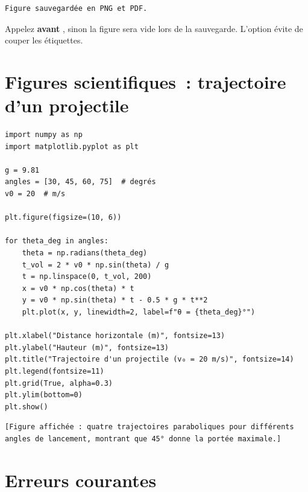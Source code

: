 \begin{codeoutput}
\begin{verbatim}
Figure sauvegardée en PNG et PDF.
\end{verbatim}
\end{codeoutput}

\begin{attention}
Appelez  \textbf{avant} , sinon la figure sera
vide lors de la sauvegarde. L'option  \'evite de couper
les \'etiquettes.
\end{attention}

\section{Figures scientifiques~: trajectoire d'un projectile}

\begin{codeblock}[title=\textbf{Python}]
\begin{verbatim}
import numpy as np
import matplotlib.pyplot as plt

g = 9.81
angles = [30, 45, 60, 75]  # degrés
v0 = 20  # m/s

plt.figure(figsize=(10, 6))

for theta_deg in angles:
    theta = np.radians(theta_deg)
    t_vol = 2 * v0 * np.sin(theta) / g
    t = np.linspace(0, t_vol, 200)
    x = v0 * np.cos(theta) * t
    y = v0 * np.sin(theta) * t - 0.5 * g * t**2
    plt.plot(x, y, linewidth=2, label=f"θ = {theta_deg}°")

plt.xlabel("Distance horizontale (m)", fontsize=13)
plt.ylabel("Hauteur (m)", fontsize=13)
plt.title("Trajectoire d'un projectile (v₀ = 20 m/s)", fontsize=14)
plt.legend(fontsize=11)
plt.grid(True, alpha=0.3)
plt.ylim(bottom=0)
plt.show()
\end{verbatim}
\end{codeblock}

\begin{codeoutput}
\begin{verbatim}
[Figure affichée : quatre trajectoires paraboliques pour différents
angles de lancement, montrant que 45° donne la portée maximale.]
\end{verbatim}
\end{codeoutput}

\section{Erreurs courantes}

